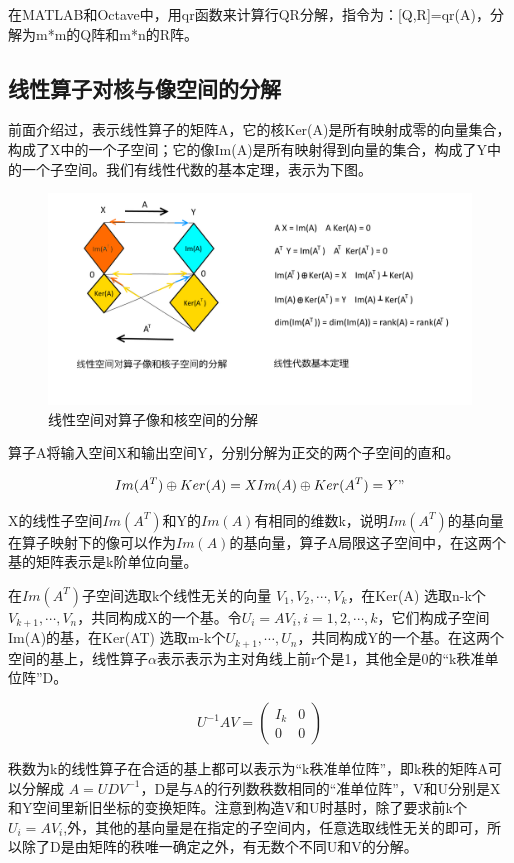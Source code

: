 在MATLAB和Octave中，用qr函数来计算行QR分解，指令为：[Q,R]=qr(A)，分解为m*m的Q阵和m*n的R阵。

\subsection{线性算子对核与像空间的分解}

前面介绍过，表示线性算子的矩阵A，它的核Ker(A)是所有映射成零的向量集合，构成了X中的一个子空间；它的像Im(A)是所有映射得到向量的集合，构成了Y中的一个子空间。我们有线性代数的基本定理，表示为下图。

\begin{figure}[h]
	\centering
	\includegraphics[width=0.7\linewidth]{pic/1604494yzy1do1yro41gva.png}
	\caption[代数学基本定理]{线性空间对算子像和核空间的分解}
	\label{fig:1604494yzy1do1yro41gva}
\end{figure}


算子A将输入空间X和输出空间Y，分别分解为正交的两个子空间的直和。

\[ Im(A^T)\oplus Ker(A)=X   Im(A)\oplus Ker(A^T)=Y"  \]%

X的线性子空间$ Im(A^T) $和Y的$ Im(A) $有相同的维数k，说明$ Im(A^T) $的基向量在算子映射下的像可以作为$ Im(A) $的基向量，算子A局限这子空间中，在这两个基的矩阵表示是k阶单位向量。

在$ Im(A^T) $子空间选取k个线性无关的向量 $ {V_1,V_2, \cdots,V_k} $，在Ker(A) 选取n-k个 $ {V_{k+1}, \cdots,V_n} $，共同构成X的一个基。令$ U_i= AV_i, i=1, 2, \cdots,k $，它们构成子空间Im(A)的基，在Ker(AT) 选取m-k个$  {U_{k+1}, \cdots,U_n} $，共同构成Y的一个基。在这两个空间的基上，线性算子$ \alpha $表示表示为主对角线上前r个是1，其他全是0的“k秩准单位阵”D。

\[U^{-1}AV = \begin{pmatrix}I_k&0\\0&0\end{pmatrix}\]

秩数为k的线性算子在合适的基上都可以表示为“k秩准单位阵”，即k秩的矩阵A可以分解成 $ A = UDV^{-1} $，D是与A的行列数秩数相同的“准单位阵”，V和U分别是X和Y空间里新旧坐标的变换矩阵。注意到构造V和U时基时，除了要求前k个$ U_i = AV_i $,外，其他的基向量是在指定的子空间内，任意选取线性无关的即可，所以除了D是由矩阵的秩唯一确定之外，有无数个不同U和V的分解。

